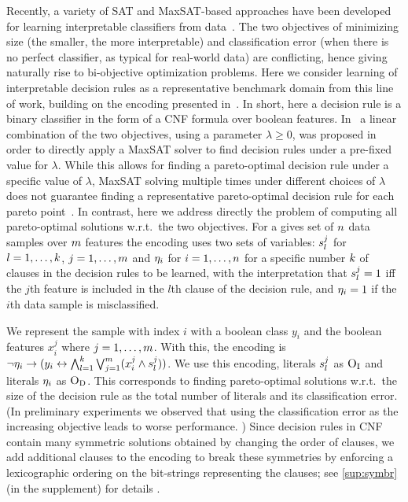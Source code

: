 Recently, a variety of SAT and MaxSAT-based approaches have been developed for learning interpretable classifiers from data~\autocite{DBLP:conf/ijcai/Ignatiev0NS21,DBLP:conf/cp/MaliotovM18,DBLP:conf/ijcai/NarodytskaIPM18,DBLP:conf/ijcai/Hu0HH20,DBLP:journals/corr/abs-2010-09919,DBLP:conf/cp/YuISB20,DBLP:conf/cade/IgnatievPNM18}.
The two objectives of minimizing size (the smaller, the more interpretable) and classification error (when there is no perfect classifier, as typical for real-world data) are conflicting, hence giving naturally rise to bi-objective optimization problems.
Here we consider learning of interpretable decision rules as a representative benchmark domain from this line of work, building on the encoding presented in~\textcite{DBLP:conf/cp/MaliotovM18}.
In short, here  a decision rule is a binary classifier in the form of a CNF formula over boolean features.
In~\textcite{DBLP:conf/cp/MaliotovM18} a linear combination of the two objectives, using a parameter $\lambda\geq 0$, was proposed in order to directly apply a MaxSAT solver to find decision rules under a pre-fixed value for $\lambda$.
While this allows for finding a pareto-optimal decision rule under a specific value of $\lambda$, MaxSAT solving multiple times under different choices of $\lambda$ does not guarantee finding a representative pareto-optimal decision rule for each pareto point~\autocite{survey}.
In contrast, here we address directly the problem of computing all pareto-optimal solutions w.r.t.\ the two objectives.
For a gives set of $n$ data samples over $m$ features the encoding uses two sets of variables:
$s_l^j$ for $l=1,\dots,k$, $j=1,\dots,m$ and $\eta_i$ for $i=1,\dots,n$ for a specific number $k$ of clauses in the decision rules to be learned, with the interpretation that $s_l^j=1$ iff the $j$th feature is included in the $l$th clause of the decision rule, and $\eta_i=1$ if the $i$th data sample is misclassified.

We represent the sample with index $i$ with a boolean class $y_i$ and the boolean features $x_i^j$ where $j=1,\dots,m$.
With this, the encoding is $\lnot \eta_i \rightarrow (y_i \leftrightarrow \bigwedge_{l=1}^k \bigvee_{j=1}^m (x_i^j \land s_l^j))$.
We use this encoding, literals $s_l^j$ as $\textsc{O}_{\text{I}}$ and literals $\eta_i$ as $\textsc{O}_{\text{D}}$.
This corresponds to finding pareto-optimal solutions w.r.t.\ the size of the decision rule as the total number of literals and its classification error.
(In preliminary experiments we observed that using the classification error as the increasing objective leads to worse performance. )
Since decision rules in CNF contain many symmetric solutions obtained by changing the order of clauses, we add additional clauses to the encoding to break these symmetries by enforcing a lexicographic ordering on the bit-strings representing the clauses; see \cref{sup:symbr} (in the supplement) for details .

